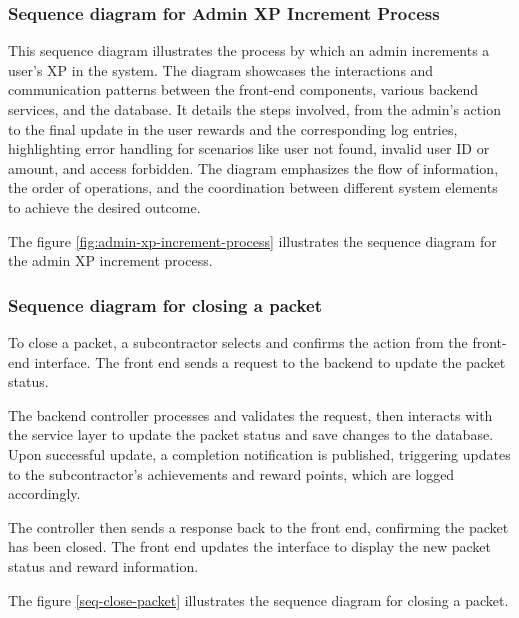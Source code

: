 \subsubsection{Sequence diagram for Admin XP Increment Process}

This sequence diagram illustrates the process by which an admin increments a user's XP in the system. The diagram showcases the interactions and communication patterns between the front-end components, various backend services, and the database. It details the steps involved, from the admin's action to the final update in the user rewards and the corresponding log entries, highlighting error handling for scenarios like user not found, invalid user ID or amount, and access forbidden. The diagram emphasizes the flow of information, the order of operations, and the coordination between different system elements to achieve the desired outcome.

\noindent The figure \ref{fig:admin-xp-increment-process} illustrates the sequence diagram for the admin XP increment process.

\subsubsection{Sequence diagram for closing a packet}

To close a packet, a subcontractor selects and confirms the action from the front-end interface. The front end sends a request to the backend to update the packet status.

The backend controller processes and validates the request, then interacts with the service layer to update the packet status and save changes to the database. Upon successful update, a completion notification is published, triggering updates to the subcontractor's achievements and reward points, which are logged accordingly.

The controller then sends a response back to the front end, confirming the packet has been closed. The front end updates the interface to display the new packet status and reward information.

\noindent The figure \ref{seq-close-packet} illustrates the sequence diagram for closing a packet.

